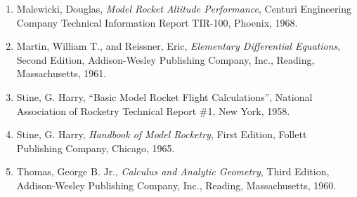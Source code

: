 \label{ch4:sec:refs}
\begin{enumerate}[label=\arabic*.,ref=\arabic*,leftmargin=*]
  \item\label{ch4:ref:1} Malewicki, Douglas, \emph{Model Rocket Altitude Performance}, Centuri Engineering Company Technical Information Report TIR-100, Phoenix, 1968.
  \item\label{ch4:ref:2} Martin, William T., and Reissner, Eric, \emph{Elementary Differential Equations}, Second Edition, Addison-Wesley Publishing Company, Inc., Reading, Massachusetts, 1961.
  \item\label{ch4:ref:3} Stine, G. Harry, ``Basic Model Rocket Flight Calculations'', National Association of Rocketry Technical Report \#1, New York, 1958.
  \item\label{ch4:ref:4} Stine, G. Harry, \emph{Handbook of Model Rocketry}, First Edition, Follett Publishing Company, Chicago, 1965.
  \item\label{ch4:ref:5} Thomas, George B. Jr., \emph{Calculus and Analytic Geometry}, Third Edition, Addison-Wesley Publishing Company, Inc., Reading, Massachusetts, 1960.
\end{enumerate}

